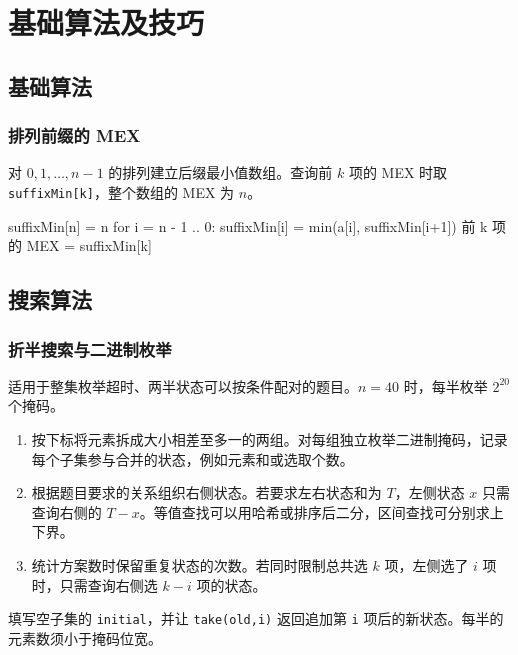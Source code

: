 \chapter{基础算法及技巧}

\section{基础算法}

\subsection{排列前缀的 MEX}

对 $0,1,\ldots,n-1$ 的排列建立后缀最小值数组。查询前 $k$ 项的 MEX 时取 \texttt{suffixMin[k]}，整个数组的 MEX 为 $n$。

\begin{pseudocode}
suffixMin[n] = n
for i = n - 1 .. 0:
    suffixMin[i] = min(a[i], suffixMin[i+1])
前 k 项的 MEX = suffixMin[k]
\end{pseudocode}

\section{搜索算法}

\subsection{折半搜索与二进制枚举}

适用于整集枚举超时、两半状态可以按条件配对的题目。$n=40$ 时，每半枚举 $2^{20}$ 个掩码。

\begin{enumerate}
    \item 按下标将元素拆成大小相差至多一的两组。对每组独立枚举二进制掩码，记录每个子集参与合并的状态，例如元素和或选取个数。
    \item 根据题目要求的关系组织右侧状态。若要求左右状态和为 $T$，左侧状态 $x$ 只需查询右侧的 $T-x$。等值查找可以用哈希或排序后二分，区间查找可分别求上下界。
    \item 统计方案数时保留重复状态的次数。若同时限制总共选 $k$ 项，左侧选了 $i$ 项时，只需查询右侧选 $k-i$ 项的状态。
\end{enumerate}

填写空子集的 \texttt{initial}，并让 \texttt{take(old,i)} 返回追加第 \texttt{i} 项后的新状态。每半的元素数须小于掩码位宽。


